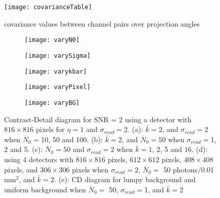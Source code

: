 \begin{figure}[ht]
\texttt{[image: covarianceTable]}
\caption{covariance values between channel pairs over projection angles}
\label{fig: covarianceTable}
\end{figure}

\begin{figure}[ht]
	\begin{subfigure}[b]{0.3\linewidth}
		\texttt{[image: varyN0]}
		\caption{}
		\label{fig:varyN0}
	\end{subfigure}
	\hspace{0.2cm}
	\begin{subfigure}[b]{0.3\linewidth}
		\texttt{[image: varySigma]}
		\caption{}
		\label{fig:varySigma}
	\end{subfigure}
	\hspace{0.2cm}	
	\begin{subfigure}[b]{0.3\linewidth}
		\texttt{[image: varykbar]}
		\caption{}
		\label{fig:varykbar}
	\end{subfigure}
	\begin{subfigure}[b]{0.3\linewidth}
		\texttt{[image: varyPixel]}
		\caption{}
		\label{fig:varyPixel}
	\end{subfigure}	
	\hspace{0.2cm}	
	\begin{subfigure}[b]{0.3\linewidth}
		\texttt{[image: varyBG]}
		\caption{}
		\label{fig:varyBG}
	\end{subfigure}
\caption{Contrast-Detail diagram for SNR = 2 using a detector with $816 \times 816$ pixels for $\eta = 1$ and $\sigma_{read} = 2$.  (a): $\bar{k} = 2$, and $\sigma_{read} = 2$ when $\overline{N}_0 = $10, 50 and 100.  (b): $\bar{k} = 2$, and $\overline{N}_0 = 50$ when $ \sigma_{read} = $1, 2 and 5.  (c): $\bar{N}_0 = 50$ and $\sigma_{read} = 2$ when $\bar{k} = $1, 2, 5 and 16.  (d): using 4 detectors with $816 \times 816$ pixels, $612 \times 612$ pixels, $408 \times 408$ pixels, and $306 \times 306$ pixels when $\sigma_{read} = 2$, $\overline{N}_0 =$ 50 photons/0.01 mm$^2$, and $\bar{k} = 2$. (e): CD diagram for lumpy background and uniform background when $\overline{N}_0 =$ 50, $\sigma_{read} = $1, and $\bar{k} = $2}
\label{fig:CD} 
\end{figure}
%
